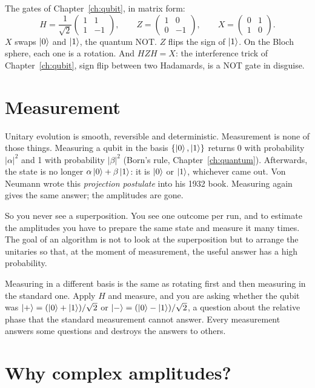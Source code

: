 The gates of Chapter~\ref{ch:qubit}, in matrix form:
\[
  H = \frac{1}{\sqrt 2}\begin{pmatrix} 1 & 1 \\ 1 & -1 \end{pmatrix},
  \qquad
  Z = \begin{pmatrix} 1 & 0 \\ 0 & -1 \end{pmatrix},
  \qquad
  X = \begin{pmatrix} 0 & 1 \\ 1 & 0 \end{pmatrix}.
\]
$X$ swaps $\ket{0}$ and $\ket{1}$, the quantum NOT. $Z$ flips the sign of
$\ket{1}$. On the Bloch sphere, each one is a rotation. And $HZH = X$: the
interference trick of Chapter~\ref{ch:qubit}, sign flip between two
Hadamards, is a NOT gate in disguise.

\section{Measurement}

Unitary evolution is smooth, reversible and deterministic. Measurement is none of
those things. Measuring a qubit in the basis $\{\ket{0}, \ket{1}\}$ returns 0
with probability $|\alpha|^2$ and 1 with probability $|\beta|^2$ (Born's rule,
Chapter~\ref{ch:quantum}). Afterwards, the state is no longer
$\alpha\ket{0} + \beta\ket{1}$: it is $\ket{0}$ or $\ket{1}$, whichever came out.
Von Neumann wrote this \emph{projection postulate} into his 1932 book. Measuring
again gives the same answer; the amplitudes are gone.

So you never see a superposition. You see one outcome per run, and to estimate the
amplitudes you have to prepare the same state and measure it many times. The goal
of an algorithm is not to look at the superposition but to arrange the unitaries
so that, at the moment of measurement, the useful answer has a high probability.

Measuring in a different basis is the same as rotating first and then measuring in
the standard one. Apply $H$ and measure, and you are asking whether the qubit was
$\ket{+} = (\ket{0} + \ket{1})/\sqrt2$ or $\ket{-} = (\ket{0} - \ket{1})/\sqrt2$,
a question about the relative phase that the standard measurement cannot answer.
Every measurement answers some questions and destroys the answers to others.

\section{Why complex amplitudes?}

